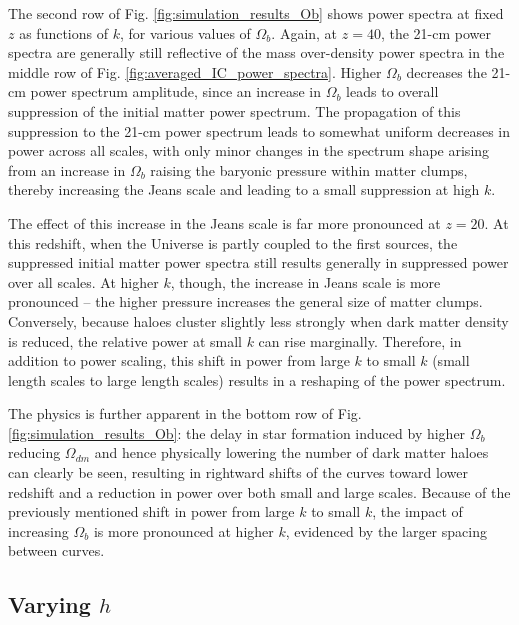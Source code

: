 \documentclass[floats,floatfix,showpacs,amssymb,prd,superscriptaddress,nofootinbib, 11pt]{revtex4-2} %
\begin{document}

The second row of Fig. \ref{fig:simulation_results_Ob} shows power spectra at fixed $z$ as functions of $k$, for various values of $\Omega_b$. Again, at $z = 40$, the 21-cm power spectra are generally still reflective of the mass over-density power spectra in the middle row of Fig. \ref{fig:averaged_IC_power_spectra}. Higher $\Omega_b$ decreases the 21-cm power spectrum amplitude, since an increase in $\Omega_b$ leads to overall suppression of the initial matter power spectrum.  The propagation of this suppression to the 21-cm power spectrum leads to somewhat uniform decreases in power across all scales, with only minor changes in the spectrum shape arising from an increase in $\Omega_b$ raising the baryonic pressure within matter clumps, thereby increasing the Jeans scale and leading to a small suppression at high $k$. 

The effect of this increase in the Jeans scale is far more pronounced at $z = 20$. At this redshift, when the Universe is partly coupled to the first sources, the suppressed initial matter power spectra still results generally in suppressed power over all scales. At higher $k$, though, the increase in Jeans scale is more pronounced -- the higher pressure increases the general size of matter clumps. Conversely, because haloes cluster slightly less strongly when dark matter density is reduced, the relative power at small $k$ can rise marginally. Therefore, in addition to power scaling, this shift in power from large $k$ to small $k$ (small length scales to large length scales) results in a reshaping of the power spectrum.

The physics is further apparent in the bottom row of Fig. \ref{fig:simulation_results_Ob}: the delay in star formation induced by higher $\Omega_b$ reducing $\Omega_{dm}$ and hence physically lowering the number of dark matter haloes can clearly be seen, resulting in rightward shifts of the curves toward lower redshift and a reduction in power over both small and large scales. Because of the previously mentioned shift in power from large $k$ to small $k$, the impact of increasing $\Omega_b$ is more pronounced at higher $k$, evidenced by the larger spacing between curves.



\subsection{Varying $h$}
\end{document}
